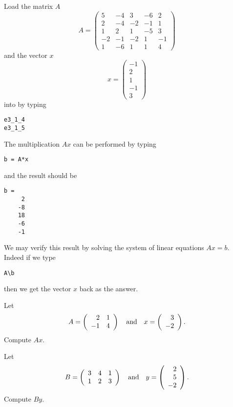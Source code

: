Load the matrix $A$
\begin{equation*}  \label{eq:5matrix}
A=\left(
\begin{array}{rrrrr}
 5 & -4 &  3 & -6 &  2 \\
 2 & -4 & -2 & -1 &  1 \\
 1 &  2 &  1 & -5 &  3 \\
-2 & -1 & -2 &  1 & -1 \\
 1 & -6 &  1 &  1 &  4
\end{array}
\right)
\end{equation*}
and the vector $x$
\begin{equation*} \label{eq:5rhs}
x=\left(
\begin{array}{r}
 -1 \\
  2 \\
  1 \\
 -1 \\
  3
\end{array}
\right)
\end{equation*}
into \Matlab by typing
\begin{verbatim}
e3_1_4
e3_1_5
\end{verbatim}
The multiplication $Ax$ can be performed by typing
\begin{verbatim}
b = A*x
\end{verbatim}  \index{\computer!*}
and the result should be
\begin{verbatim}
b =
     2
    -8
    18
    -6
    -1
\end{verbatim}
We may verify this result by solving the system of linear
equations $Ax=b$.  Indeed if we type
\begin{verbatim}
A\b
\end{verbatim}  \index{\computer!$\backslash$}
then we get the vector $x$ back as the answer.

\EXER

\TEXER


\begin{exercise} \label{c4.1.1}
Let
\[
A = \left(\begin{array}{rr} 2 & 1\\ -1 &4\end{array}\right) \quad\mbox{and}\quad x = \left(\begin{array}{r} 3 \\ -2\end{array}\right).
\]
Compute $Ax$.
\end{exercise}

\begin{exercise} \label{c4.1.2}
Let
\[
B=\left(\begin{array}{ccc} 3 & 4 & 1\\ 1& 2 & 3 \end{array}\right)
\quad\mbox{and}\quad y=\left(\begin{array}{r} 2 \\ 5 \\ -2 \end{array}\right).
\]
Compute $By$.
\end{exercise}

